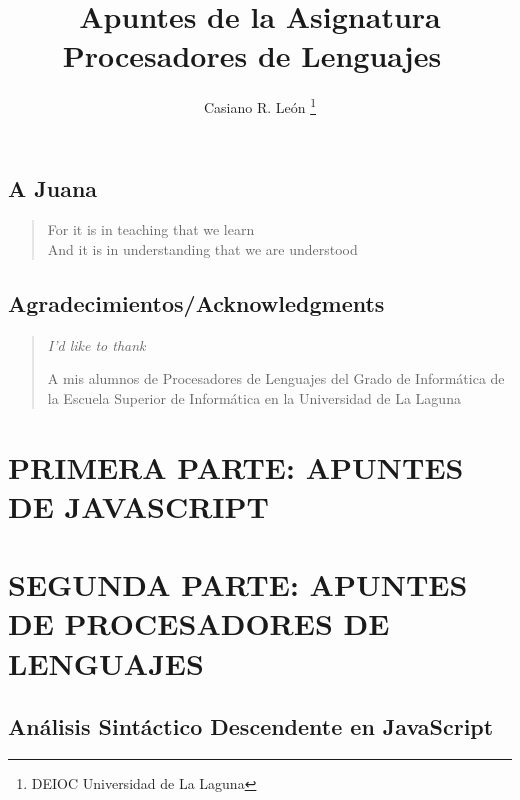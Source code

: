 \documentclass[11pt,a4paper,oneside,onecolumn]{book}
\title{Apuntes de la Asignatura Procesadores de Lenguajes\
  }
\author{Casiano R. León \thanks{DEIOC Universidad de La Laguna}}
\begin{document}
\topmargin=5pt
\maketitle


\tableofcontents 
\listoffigures
\listoftables


\chapter*{A Juana}
\vspace{8cm}
{\it
\begin{Large}
\begin{verse}
\flushright 
For it is in teaching that we learn\\
And it is in understanding that we are understood
\end{verse}
\end{Large}
}

\chapter*{Agradecimientos/Acknowledgments}
\begin{verse}
\flushright \it
I'd like to thank 

A mis alumnos de 
Procesadores de Lenguajes del Grado de Informática
de la Escuela Superior de Informática en la Universidad de La Laguna
\end{verse}




\part{PRIMERA PARTE: APUNTES DE JAVASCRIPT}



\part{SEGUNDA PARTE: APUNTES DE PROCESADORES DE LENGUAJES}









\chapter{Análisis Sintáctico Descendente en JavaScript}
\end{document}
